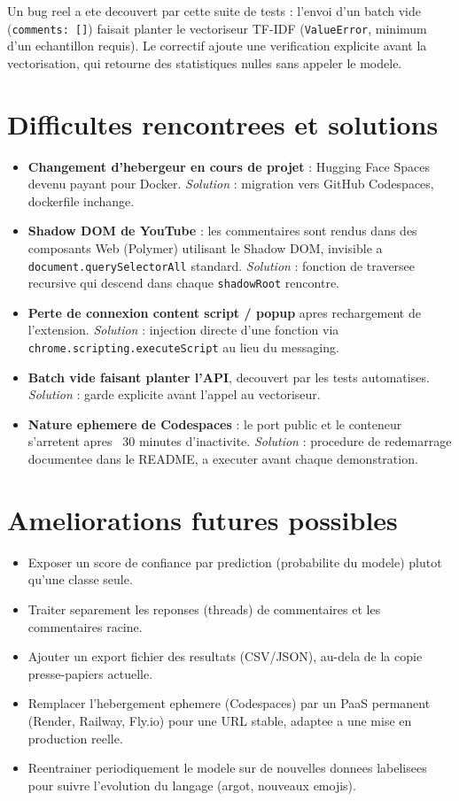 \documentclass[11pt,a4paper]{article}
\begin{document}
Un bug reel a ete decouvert par cette suite de tests : l'envoi d'un batch vide (\texttt{comments: []}) faisait planter le vectoriseur TF-IDF (\texttt{ValueError}, minimum d'un echantillon requis). Le correctif ajoute une verification explicite avant la vectorisation, qui retourne des statistiques nulles sans appeler le modele.

\section{Difficultes rencontrees et solutions}

\begin{itemize}
  \item \textbf{Changement d'hebergeur en cours de projet} : Hugging Face Spaces devenu payant pour Docker. \emph{Solution} : migration vers GitHub Codespaces, dockerfile inchange.
  \item \textbf{Shadow DOM de YouTube} : les commentaires sont rendus dans des composants Web (Polymer) utilisant le Shadow DOM, invisible a \texttt{document.querySelectorAll} standard. \emph{Solution} : fonction de traversee recursive qui descend dans chaque \texttt{shadowRoot} rencontre.
  \item \textbf{Perte de connexion content script / popup} apres rechargement de l'extension. \emph{Solution} : injection directe d'une fonction via \texttt{chrome.scripting.executeScript} au lieu du messaging.
  \item \textbf{Batch vide faisant planter l'API}, decouvert par les tests automatises. \emph{Solution} : garde explicite avant l'appel au vectoriseur.
  \item \textbf{Nature ephemere de Codespaces} : le port public et le conteneur s'arretent apres ~30 minutes d'inactivite. \emph{Solution} : procedure de redemarrage documentee dans le README, a executer avant chaque demonstration.
\end{itemize}

\section{Ameliorations futures possibles}
\label{sec:futur}

\begin{itemize}
  \item Exposer un score de confiance par prediction (probabilite du modele) plutot qu'une classe seule.
  \item Traiter separement les reponses (threads) de commentaires et les commentaires racine.
  \item Ajouter un export fichier des resultats (CSV/JSON), au-dela de la copie presse-papiers actuelle.
  \item Remplacer l'hebergement ephemere (Codespaces) par un PaaS permanent (Render, Railway, Fly.io) pour une URL stable, adaptee a une mise en production reelle.
  \item Reentrainer periodiquement le modele sur de nouvelles donnees labelisees pour suivre l'evolution du langage (argot, nouveaux emojis).
\end{itemize}
\end{document}
